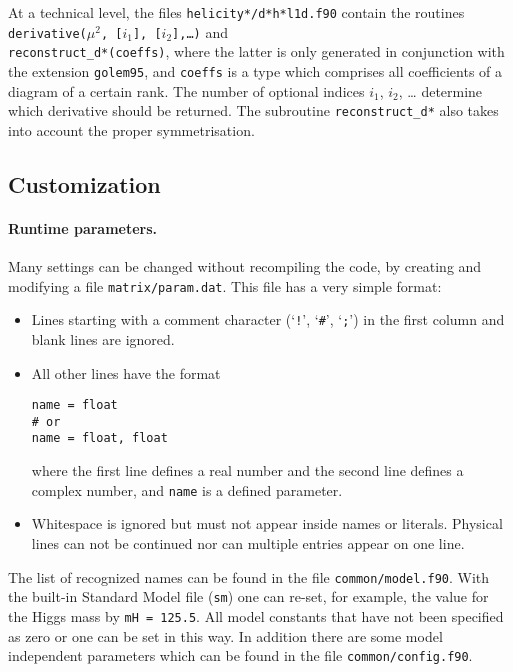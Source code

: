 At a technical level, 
the files \texttt{helicity*/d*h*l1d.f90} contain the routines
\texttt{derivative($\mu^2$, [$i_1$], [$i_2$],\dots)} and\\
\texttt{reconstruct\_d*(coeffs)}, where the latter is only generated in
conjunction with the extension \texttt{golem95}, and \texttt{coeffs} is
a type which comprises all coefficients of a diagram of a certain rank.
The number of optional indices $i_1$, $i_2$, \dots 
determine which derivative should be returned. The subroutine
\texttt{reconstruct\_d*} also takes into account the proper symmetrisation.

\subsection{Customization}\label{sec:Customization}
\paragraph{Runtime parameters.}
Many settings can be changed without recompiling the code, by
creating and modifying a file \texttt{matrix/param.dat}.
This file has a very simple format:
\begin{itemize}
\item Lines starting with a comment character (`\texttt{!}', `\texttt{\#}', `\texttt{;}')
      in the first column and blank lines are ignored.
\item All other lines have the format
\begin{lstlisting}[style=in]
name = float
# or
name = float, float
\end{lstlisting}
      where the first line defines a real number and the second
      line defines a complex number, and \texttt{name} is a defined
      parameter.
\item Whitespace is ignored but must not appear inside names or
      literals. Physical lines can not be continued nor can
      multiple entries appear on one line.
\end{itemize}
The list of recognized names can be found in the file
\texttt{common/model.f90}. 
With the built-in Standard Model file (\texttt{sm}) one
can re-set, for example, the value for the Higgs mass by 
\texttt{mH = 125.5}.
All model constants that have not been specified as zero or one
can be set in this way. 
In addition there are some model independent parameters which can be found in the file 
\texttt{common/config.f90}.

